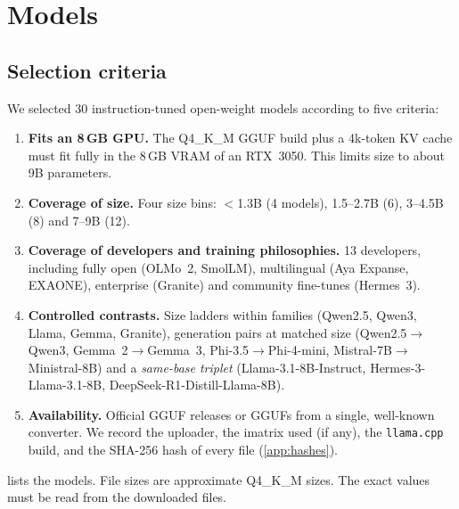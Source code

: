 \section{Models}
\label{sec:models}

\subsection{Selection criteria}
We selected 30 instruction-tuned open-weight models according to five criteria:
\begin{enumerate}[leftmargin=1.5em,itemsep=1pt]
  \item \textbf{Fits an 8\,GB GPU.} The Q4\_K\_M GGUF build plus a 4k-token KV cache
  must fit fully in the 8\,GB VRAM of an RTX~3050. This limits size to about 9B
  parameters.
  \item \textbf{Coverage of size.} Four size bins: $<$1.3B (4 models), 1.5--2.7B
  (6), 3--4.5B (8) and 7--9B (12).
  \item \textbf{Coverage of developers and training philosophies.} 13 developers,
  including fully open (OLMo~2, SmolLM), multilingual (Aya Expanse, EXAONE), enterprise
  (Granite) and community fine-tunes (Hermes~3).
  \item \textbf{Controlled contrasts.} Size ladders within families (Qwen2.5, Qwen3,
  Llama, Gemma, Granite), generation pairs at matched size (Qwen2.5$\rightarrow$Qwen3,
  Gemma~2$\rightarrow$Gemma~3, Phi-3.5$\rightarrow$Phi-4-mini,
  Mistral-7B$\rightarrow$Ministral-8B) and a \emph{same-base triplet}
  (Llama-3.1-8B-Instruct, Hermes-3-Llama-3.1-8B, DeepSeek-R1-Distill-Llama-8B).
  \item \textbf{Availability.} Official GGUF releases or GGUFs from a single,
  well-known converter. We record the uploader, the imatrix used (if any), the
  \texttt{llama.cpp} build, and the SHA-256 hash of every file (\cref{app:hashes}).
\end{enumerate}

 lists the models. File sizes are approximate Q4\_K\_M sizes. The
exact values must be read from the downloaded files.

